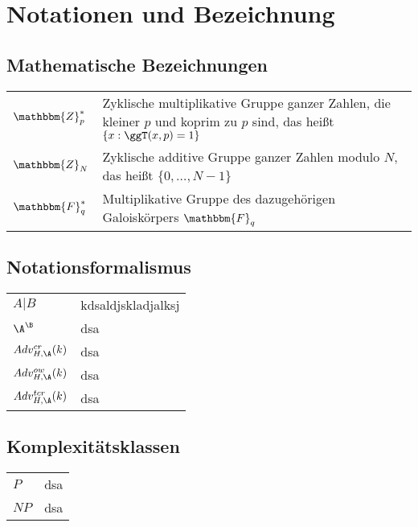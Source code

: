 \chapter{Notationen und Bezeichnung}
\section{Mathematische Bezeichnungen}

\setlength{\tabcolsep}{12pt}
\def\arraystretch{1.5}%
\begin{tabular}{l|l}
	$\mathbbm{Z}^{\ast}_p$ & Zyklische multiplikative Gruppe ganzer Zahlen, die kleiner $p$ und koprim zu $p$ sind, das heißt $\{x : \ggT(x, p) = 1\}$\\
	$\mathbbm{Z}_N$ & Zyklische additive Gruppe ganzer Zahlen modulo $N$, das heißt $\{0, \dots, N-1\}$\\
	$\mathbbm{F}^{\ast}_q$ & Multiplikative Gruppe des dazugehörigen Galoiskörpers $\mathbbm{F}_q$
\end{tabular}

\section{Notationsformalismus}
\begin{tabular}{l|l}
	$A \vert B$ & kdsaldjskladjalksj\\
	$\A^{\B}$ &dsa\\
	$Adv^{cr}_{H,\A}(k)$ & dsa \\
	$Adv^{ow}_{H,\A}(k)$ & dsa \\
	$Adv^{tcr}_{H,\A}(k)$ & dsa
\end{tabular}

\section{Komplexitätsklassen}
\begin{tabular}{l|l}
	$P$ & dsa \\
	$NP$ & dsa
\end{tabular}